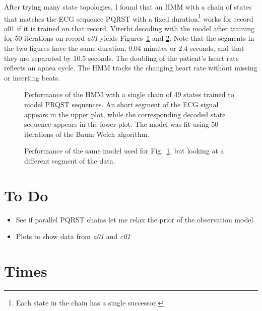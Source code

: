 \documentclass[12pt]{article}
\begin{document}
After trying many state topologies, I found that an HMM with a chain
of states that matches the ECG sequence PQRST with a fixed
duration\footnote{Each state in the chain has a single successor.}
works for record a01 if it is trained on that record.  Viterbi
decoding with the model after training for 50 iterations on record
\emph{a01} yields Figures~\ref{fig:dict_states_70} and
\ref{fig:dict_states_71}.  Note that the segments in the two figures
have the same duration, 0.04 minutes or 2.4 seconds, and that they are
separated by 10.5 seconds.  The doubling of the patient's heart rate
reflects an apnea cycle.  The HMM tracks the changing heart rate
without missing or inserting beats.

\begin{figure}
  \centering
    \caption{Performance of the HMM with a single chain of 49 states
      trained to model PRQST sequences.  An short segment of the ECG
      signal appears in the upper plot, while the corresponding
      decoded state sequence appears in the lower plot.  The model was
      fit using 50 iterations of the Baum Welch algorithm.}
  \label{fig:dict_states_70}
\end{figure}

\begin{figure}
  \centering
    \caption{Performance of the same model used for
      Fig.~\ref{fig:dict_states_70}, but looking at a different
      segment of the data.}
    \label{fig:dict_states_71}
\end{figure}

\section{To Do}
\label{sec:todo}

\begin{itemize}
\item See if parallel PQRST chains let me relax the prior of the
  observation model.
\item Plots to show data from \emph{a01} and \emph{c01}
\end{itemize}
\section{Times}
\label{sec:times}
\end{document}
